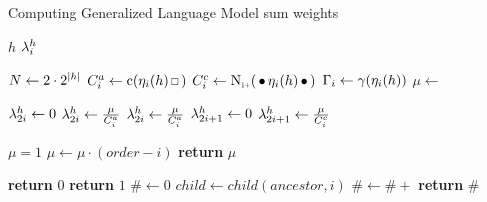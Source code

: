 \begin{algorithm}
  \caption{Computing Generalized Language Model sum weights}
  \label{alg:weightedsum-glm}
  \begin{algorithmic}[1]
    \Require $h$
    \Ensure $\lambda_i^h$

    \State $N \gets 2 \cdot 2^{\left|h\right|}$
      \State $C_i^a \gets \Count(\History_i(h) \Skp)$
      \State $C_i^c \gets \ContCountIp(\WSkp \History_i(h) \WSkp)$
      \State $\Gamma_i \gets \gamma(\eta_i(h))$
      \State $\mu \gets$ 

        \State $\lambda_{2 i}^h \gets 0$
        \State $\lambda_{2 i}^h \gets \frac{\mu}{C_i^a}$
      \Else
        \State $\lambda_{2 i}^h \gets \frac{\mu}{C_i^a}$ 
      \EndIf
        \State $\lambda_{2 i + 1}^h \gets 0$
      \Else
        \State $\lambda_{2 i + 1}^h \gets \frac{\mu}{C_i^c}$ 
      \EndIf
    \EndFor
  \end{algorithmic}
\end{algorithm}

\begin{algorithm}
  \begin{algorithmic}[1]
      \State $\mu = 1$
        \State $\mu \gets \mu \cdot (order - i)$
      \EndFor
      \State \textbf{return} $\mu$
    \EndFunction
  \end{algorithmic}
\end{algorithm}

\begin{algorithm}
  \begin{algorithmic}[1]
        \State \textbf{return} $0$
      \EndIf
        \State \textbf{return} $1$
      \EndIf
      \State $\# \gets 0$
        \State $child \gets child(ancestor, i)$
          \State $\# \gets \# + {}$ 
        \EndIf
      \EndFor
      \State \textbf{return} $\#$
    \EndFunction
  \end{algorithmic}
\end{algorithm}

